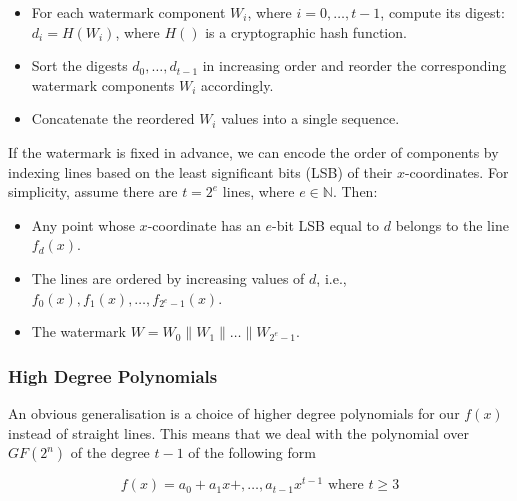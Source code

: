 \documentclass[a4paper,11pt]{llncs}
\begin{document}
\begin{itemize}
    \item For each watermark component $W_i$, where $i = 0, \ldots, t-1$, compute its digest: $d_i = H(W_i)$, where $H()$ is a cryptographic hash function.
    
    \item Sort the digests ${d_0, \ldots, d_{t-1}}$ in increasing order and reorder the corresponding watermark components $W_i$ accordingly.
    
    \item Concatenate the reordered $W_i$ values into a single sequence.
\end{itemize}

If the watermark is fixed in advance, we can encode the order of components by indexing lines based on the least significant bits (LSB) of their $x$-coordinates. For simplicity, assume there are $t = 2^e$ lines, where $e \in {\mathbb N}$. Then:

\begin{itemize}
    \item Any point whose $x$-coordinate has an $e$-bit LSB equal to $d$ belongs to the line $f_d(x)$.

    \item The lines are ordered by increasing values of $d$, i.e., $f_0(x), f_1(x), \ldots, f_{2^e - 1}(x)$.
    
    \item The watermark $W=W_0\|W_1\|\ldots\|W_{2^e-1}$.
\end{itemize}


\subsubsection{High Degree Polynomials}
An obvious generalisation is a choice of higher degree polynomials for our $f(x)$ instead of straight lines. This means that we deal with the polynomial over $GF(2^n)$ of the degree $t-1$ of the following form

\[
	f(x)=a_0+a_1x+,\ldots,a_{t-1}x^{t-1} \mbox{ where } t\geq 3
\]
\end{document}
